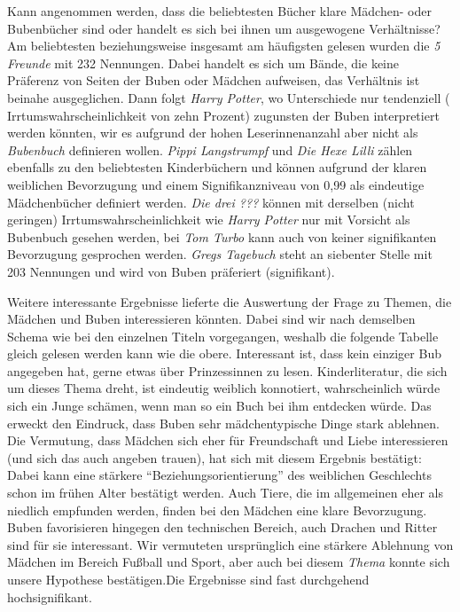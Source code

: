 Kann angenommen werden, dass die beliebtesten Bücher klare Mädchen- oder
Bubenbücher sind oder handelt es sich bei ihnen um ausgewogene
Verhältnisse? Am beliebtesten beziehungsweise insgesamt am häufigsten
gelesen wurden die \emph{5 Freunde} mit 232 Nennungen. Dabei handelt es
sich um Bände, die keine Präferenz von Seiten der Buben oder Mädchen
aufweisen, das Verhältnis ist beinahe ausgeglichen. Dann folgt
\emph{Harry Potter}, wo Unterschiede nur tendenziell (
Irrtumswahrscheinlichkeit von zehn Prozent) zugunsten der Buben
interpretiert werden könnten, wir es aufgrund der hohen Leserinnenanzahl
aber nicht als \emph{Bubenbuch} definieren wollen. \emph{Pippi
Langstrumpf} und \emph{Die Hexe Lilli} zählen ebenfalls zu den
beliebtesten Kinderbüchern und können aufgrund der klaren weiblichen
Bevorzugung und einem Signifikanzniveau von 0,99 als eindeutige
Mädchenbücher definiert werden. \emph{Die drei ???} können mit derselben
(nicht geringen) Irrtumswahrscheinlichkeit wie \emph{Harry Potter} nur
mit Vorsicht als Bubenbuch gesehen werden, bei \emph{Tom Turbo} kann
auch von keiner signifikanten Bevorzugung gesprochen werden. \emph{Gregs
Tagebuch} steht an siebenter Stelle mit 203 Nennungen und wird von Buben
präferiert (signifikant).

Weitere interessante Ergebnisse lieferte die Auswertung der Frage zu
Themen, die Mädchen und Buben interessieren könnten. Dabei sind wir nach
demselben Schema wie bei den einzelnen Titeln vorgegangen, weshalb die
folgende Tabelle gleich gelesen werden kann wie die obere. Interessant
ist, dass kein einziger Bub angegeben hat, gerne etwas über
Prinzessinnen zu lesen. Kinderliteratur, die sich um dieses Thema dreht,
ist eindeutig weiblich konnotiert, wahrscheinlich würde sich ein Junge
schämen, wenn man so ein Buch bei ihm entdecken würde. Das erweckt den
Eindruck, dass Buben sehr mädchentypische Dinge stark ablehnen. Die
Vermutung, dass Mädchen sich eher für Freundschaft und Liebe
interessieren (und sich das auch angeben trauen), hat sich mit diesem
Ergebnis bestätigt: Dabei kann eine stärkere ``Beziehungsorientierung''
des weiblichen Geschlechts schon im frühen Alter bestätigt werden. Auch
Tiere, die im allgemeinen eher als niedlich empfunden werden, finden bei
den Mädchen eine klare Bevorzugung. Buben favorisieren hingegen den
technischen Bereich, auch Drachen und Ritter sind für sie interessant.
Wir vermuteten ursprünglich eine stärkere Ablehnung von Mädchen im
Bereich Fußball und Sport, aber auch bei diesem \emph{Thema} konnte sich
unsere Hypothese bestätigen.Die Ergebnisse sind fast durchgehend
hochsignifikant.

